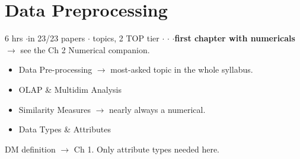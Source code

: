 \section{Data Preprocessing}

{\color{sub}\footnotesize 6 hrs \gap$\cdot$\gap in 23/23 papers \gap$\cdot$ topics, 2 TOP tier \gap$\cdot$\gap {} \gap$\cdot$\gap {}
\gap$\cdot$\gap \textbf{first chapter with numericals} $\rightarrow$ see the Ch 2 Numerical companion.}

\begin{itemize}
  \item Data Pre-processing  \gap $\rightarrow$ most-asked topic in the whole syllabus.
  \item OLAP \& Multidim Analysis 
  \item Similarity Measures  \gap $\rightarrow$ nearly always a numerical.
  \item Data Types \& Attributes 
\end{itemize}

\hr


{\color{sub}\footnotesize {}  \gap DM definition $\rightarrow$ Ch 1. Only attribute types needed here.}

